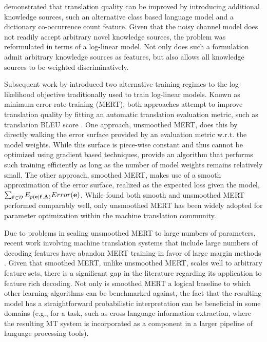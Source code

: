 \documentclass[11pt]{article}
\begin{document}
 demonstrated that translation quality can be improved by introducing additional knowledge sources, such an alternative class based language model and a dictionary co-occurrence count feature. Given that the noisy channel model does not readily accept arbitrary novel knowledge sources, the problem was reformulated in terms of a log-linear model. Not only does such a formulation admit arbitrary knowledge sources as features, but also allows all knowledge sources to be weighted discriminatively.

Subsequent work by  introduced two alternative training regimes to the log-likelihood objective traditionally used to train log-linear models. Known as minimum error rate training (MERT), both approaches attempt to improve translation quality by fitting an automatic translation evaluation metric, such as translation BLEU score \cite{kishore2002}. One approach, unsmoothed MERT, does this by directly walking the error surface provided by an evaluation metric w.r.t. the model weights. While this surface is piece-wise constant and thus cannot be optimized using gradient based techniques,  provide an algorithm that performs such training efficiently as long as the number of model weights remains relatively small. The other approach, smoothed MERT, makes use of a smooth approximation of the error surface, realized as the expected loss given the model, $\sum_{{\bf f} \in {\cal D}} E_{p({\bf e}|{\bf f}, {\bf \Lambda})} Error({\bf e})$. While  found both smooth and unsmoothed MERT performed comparably well, only unsmoothed MERT has been widely adopted for parameter optimization within the machine translation community.

Due to problems in scaling unsmoothed MERT to large numbers of parameters, recent work involving machine translation systems that include large numbers of decoding features have abandon MERT training in favor of large margin methods \cite{liang2006} \cite{tillmann2006} \cite{watanabe2007} \cite{arun2007}. Given that smoothed MERT, unlike unsmoothed MERT, scales well to arbitrary feature sets, there is a significant gap in the literature regarding its application to feature rich decoding. Not only is smoothed MERT a logical baseline to which other learning algorithms can be benchmarked against, the fact that the resulting model has a straightforward probabilistic interpretation can be beneficial in some domains (e.g., for a task, such as cross language information extraction, where the resulting MT system is incorporated as a component in a larger pipeline of language processing tools).  
\end{document}
